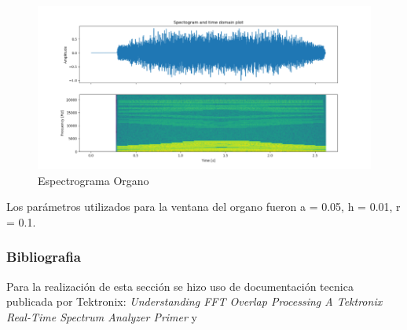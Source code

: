 \begin{figure}[H]
	\centering
	\includegraphics[width=0.7\linewidth]{ImagenesEjercicio7/EspectogramaOrganoEscala}
	\caption{Espectrograma Organo}
	\label{fig:espectogramaorganoescala}
\end{figure}
Los parámetros utilizados para la ventana del organo fueron
a = 0.05, h = 0.01, r = 0.1.
\subsubsection{Bibliografia}
Para la realización de esta sección se hizo uso de documentación tecnica publicada por Tektronix: \textit{Understanding FFT Overlap Processing
A Tektronix Real-Time Spectrum Analyzer Primer} y 
